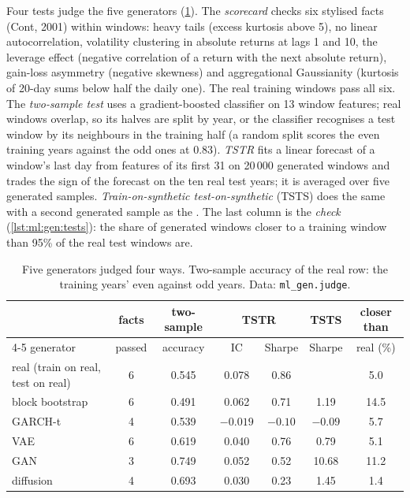 Four tests judge the five generators (\cref{tab:ml:gen:judge}). The \emph{scorecard} checks six stylised facts (Cont,
2001) within windows: heavy tails (excess kurtosis above 5), no linear autocorrelation, volatility clustering in absolute
returns at lags 1 and 10, the leverage effect (negative correlation of a return with the next absolute return), gain-loss
asymmetry (negative skewness) and aggregational Gaussianity (kurtosis of 20-day sums below half the daily one). The real
training windows pass all six. The \emph{two-sample test} uses a gradient-boosted classifier on 13 window features; real
windows overlap, so its halves are split by year, or the classifier recognises a test window by its neighbours in the
training half (a random split scores the even training years against the odd ones at 0.83). \emph{TSTR} fits a linear
forecast of a window's last day from features of its first 31 on 20\,000 generated windows and trades the sign of the
forecast on the ten real test years; it is averaged over five generated samples. \emph{Train-on-synthetic
test-on-synthetic} (TSTS) does the same with a second generated sample as the . The last column is the
\emph{ check} (\cref{lst:ml:gen:tests}): the share of generated windows closer to a training window than 95\% of
the real test windows are.

\begin{table}[htbp]
\centering\small
\begin{tabular}{@{}lcccccc@{}}
\toprule
& facts & two-sample & \multicolumn{2}{c}{TSTR} & TSTS & closer than\\
\cmidrule(lr){4-5}
generator & passed & accuracy & IC & Sharpe & Sharpe & real (\%)\\
\midrule
real (train on real, test on real) & 6 & 0.545 & 0.078 & 0.86 & & 5.0\\
block bootstrap & 6 & 0.491 & 0.062 & 0.71 & 1.19 & 14.5\\
GARCH-t & 4 & 0.539 & $-0.019$ & $-0.10$ & $-0.09$ & 5.7\\
VAE & 6 & 0.619 & 0.040 & 0.76 & 0.79 & 5.1\\
GAN & 3 & 0.749 & 0.052 & 0.52 & 10.68 & 11.2\\
diffusion & 4 & 0.693 & 0.030 & 0.23 & 1.45 & 1.4\\
\bottomrule
\end{tabular}
\caption{Five generators judged four ways. Two-sample accuracy of the real row: the training years' even against odd
years. Data: \texttt{ml\_gen.judge}.}\label{tab:ml:gen:judge}
\end{table}

